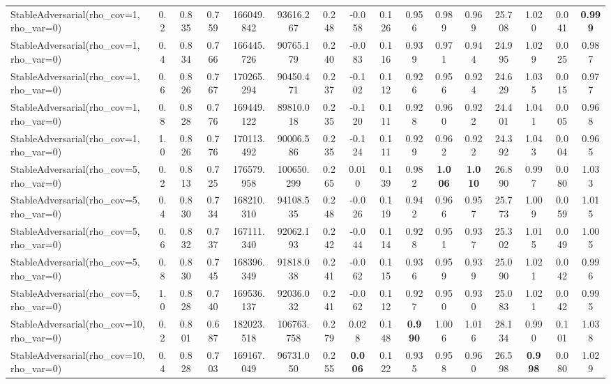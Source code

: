 \documentclass[11pt]{article}
\theoremstyle{plain}
\theoremstyle{definition}
\newcommand{\1}{\mathbf{1}}
\begin{document}
\begin{table}[h]
{\begin{tabular}{lccccccccccccccc}
StableAdversarial(rho\_cov=1, rho\_var=0) & 0.2 & 0.835 & 0.759 & 166049.842 & 93616.267 & 0.248 & -0.058 & 0.126 & 0.956 & 0.989 & 0.969 & 25.708 & 1.020 & 0.041 & \textbf{0.999} \\
StableAdversarial(rho\_cov=1, rho\_var=0) & 0.4 & 0.834 & 0.766 & 166445.726 & 90765.179 & 0.240 & -0.083 & 0.116 & 0.939 & 0.971 & 0.944 & 24.995 & 1.029 & 0.025 & 0.987 \\
StableAdversarial(rho\_cov=1, rho\_var=0) & 0.6 & 0.826 & 0.767 & 170265.294 & 90450.471 & 0.237 & -0.102 & 0.112 & 0.926 & 0.956 & 0.924 & 24.629 & 1.035 & 0.015 & 0.977 \\
StableAdversarial(rho\_cov=1, rho\_var=0) & 0.8 & 0.828 & 0.776 & 169449.122 & 89810.018 & 0.235 & -0.120 & 0.111 & 0.928 & 0.960 & 0.922 & 24.401 & 1.041 & 0.005 & 0.968 \\
StableAdversarial(rho\_cov=1, rho\_var=0) & 1.0 & 0.826 & 0.776 & 170113.492 & 90006.586 & 0.235 & -0.124 & 0.111 & 0.929 & 0.962 & 0.922 & 24.392 & 1.043 & 0.004 & 0.965 \\
StableAdversarial(rho\_cov=5, rho\_var=0) & 0.2 & 0.813 & 0.725 & 176579.958 & 100650.299 & 0.265 & 0.010 & 0.139 & 0.982 & \textbf{1.006} & \textbf{1.010} & 26.890 & 0.997 & 0.080 & 1.033 \\
StableAdversarial(rho\_cov=5, rho\_var=0) & 0.4 & 0.830 & 0.734 & 168210.310 & 94108.535 & 0.248 & -0.026 & 0.119 & 0.942 & 0.966 & 0.957 & 25.773 & 1.009 & 0.059 & 1.015 \\
StableAdversarial(rho\_cov=5, rho\_var=0) & 0.6 & 0.832 & 0.737 & 167111.340 & 92062.193 & 0.242 & -0.044 & 0.114 & 0.928 & 0.951 & 0.937 & 25.302 & 1.015 & 0.049 & 1.005 \\
StableAdversarial(rho\_cov=5, rho\_var=0) & 0.8 & 0.830 & 0.745 & 168396.349 & 91818.038 & 0.241 & -0.062 & 0.115 & 0.936 & 0.959 & 0.939 & 25.090 & 1.021 & 0.042 & 0.996 \\
StableAdversarial(rho\_cov=5, rho\_var=0) & 1.0 & 0.828 & 0.740 & 169536.137 & 92036.032 & 0.241 & -0.062 & 0.112 & 0.927 & 0.950 & 0.930 & 25.083 & 1.021 & 0.042 & 0.995 \\
StableAdversarial(rho\_cov=10, rho\_var=0) & 0.2 & 0.801 & 0.687 & 182023.518 & 106763.758 & 0.279 & 0.028 & 0.148 & \textbf{0.990} & 1.006 & 1.016 & 28.134 & 0.990 & 0.101 & 1.038 \\
StableAdversarial(rho\_cov=10, rho\_var=0) & 0.4 & 0.828 & 0.703 & 169167.049 & 96731.050 & 0.255 & \textbf{0.006} & 0.122 & 0.935 & 0.958 & 0.960 & 26.598 & \textbf{0.998} & 0.080 & 1.029 \\

\end{tabular}}
\end{table}
\end{document}
